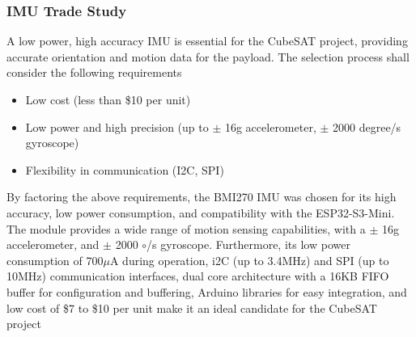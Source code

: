 \documentclass{report}
\begin{document}
                \subsubsection{IMU Trade Study}
                    A low power, high accuracy IMU is essential for the CubeSAT project, providing
                    accurate orientation and motion data for the payload. The selection process shall
                    consider the following requirements
                    \begin{itemize}
                        \item Low cost (less than \$10 per unit)
                        \item Low power and high precision (up to $\pm$ 16g accelerometer, $\pm$ 2000 degree/s gyroscope)
                        \item Flexibility in communication (I2C, SPI)
                    \end{itemize}
                    By factoring the above requirements, the BMI270 IMU was chosen for its high accuracy,
                    low power consumption, and compatibility with the ESP32-S3-Mini. The module provides
                    a wide range of motion sensing capabilities, with a $\pm$ 16g accelerometer, and $\pm$ 2000 $\circ$/s gyroscope.
                    Furthermore, its low power consumption of 700$\mu$A during operation, i2C (up to 3.4MHz) and SPI (up to 10MHz) communication
                    interfaces, dual core architecture with a 16KB FIFO buffer for configuration and buffering,
                    Arduino libraries for easy integration, and low cost of \$7 to \$10 per unit make it an ideal candidate for the CubeSAT project \cite{bmidatasheet}
\end{document}
